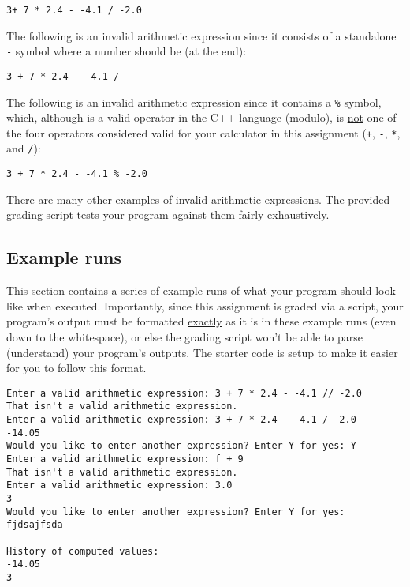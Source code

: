 \documentclass{article}
\newcounter{examplerun}
\newenvironment{examplerun}
    {\begin{tcolorbox}[title=Example Run \refstepcounter{examplerun}\theexamplerun,colframe=black!50!green,colback=white,subtitle style={boxrule=0.4pt,
colback=lightgray!80!green}]}
    {\end{tcolorbox}}
\begin{document}
\begin{verbatim}
3+ 7 * 2.4 - -4.1 / -2.0
\end{verbatim}

The following is an invalid arithmetic expression since it consists of a standalone \texttt{-} symbol where a number should be (at the end):

\begin{verbatim}
3 + 7 * 2.4 - -4.1 / -
\end{verbatim}

The following is an invalid arithmetic expression since it contains a \texttt{\%} symbol, which, although is a valid operator in the C++ language (modulo), is \ul{not} one of the four operators considered valid for your calculator in this assignment (\texttt{+}, \texttt{-}, \texttt{*}, and \texttt{/}):

\begin{verbatim}
3 + 7 * 2.4 - -4.1 % -2.0
\end{verbatim}

There are many other examples of invalid arithmetic expressions. The provided grading script tests your program against them fairly exhaustively.

\subsection{Example runs}
\label{subsection:example_runs}

This section contains a series of example runs of what your program should look like when executed. Importantly, since this assignment is graded via a script, your program's output must be formatted \ul{exactly} as it is in these example runs (even down to the whitespace), or else the grading script won't be able to parse (understand) your program's outputs. The starter code is setup to make it easier for you to follow this format.

\begin{examplerun}
    \begin{verbatim}
Enter a valid arithmetic expression: 3 + 7 * 2.4 - -4.1 // -2.0
That isn't a valid arithmetic expression.
Enter a valid arithmetic expression: 3 + 7 * 2.4 - -4.1 / -2.0
-14.05
Would you like to enter another expression? Enter Y for yes: Y
Enter a valid arithmetic expression: f + 9
That isn't a valid arithmetic expression.
Enter a valid arithmetic expression: 3.0
3
Would you like to enter another expression? Enter Y for yes: fjdsajfsda

History of computed values:
-14.05
3
    \end{verbatim}
\end{examplerun}
\end{document}
